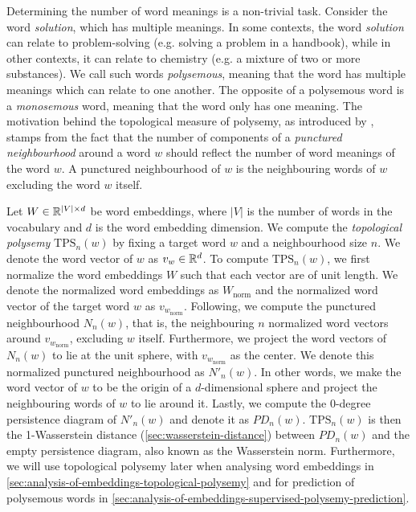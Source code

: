 Determining the number of word meanings is a non-trivial task. Consider the word \textit{solution}, which has multiple meanings. In some contexts, the word \textit{solution} can relate to problem-solving (e.g. solving a problem in a handbook), while in other contexts, it can relate to chemistry (e.g. a mixture of two or more substances). We call such words \textit{polysemous}, meaning that the word has multiple meanings which can relate to one another. The opposite of a polysemous word is a \textit{monosemous} word, meaning that the word only has one meaning. The motivation behind the topological measure of polysemy, as introduced by \cite{jakubowski2020topology}, stamps from the fact that the number of components of a \textit{punctured neighbourhood} around a word $w$ should reflect the number of word meanings of the word $w$. A punctured neighbourhood of $w$ is the neighbouring words of $w$ excluding the word $w$ itself.

Let $W \in \mathbb{R}^{|V| \times d}$ be word embeddings, where $|V|$ is the number of words in the vocabulary and $d$ is the word embedding dimension. We compute the \textit{topological polysemy} $\text{TPS}_n(w)$ by fixing a target word $w$ and a neighbourhood size $n$. We denote the word vector of $w$ as $v_w \in \mathbb{R}^{d}$. To compute $\text{TPS}_n(w)$, we first normalize the word embeddings $W$ such that each vector are of unit length. We denote the normalized word embeddings as $W_\text{norm}$ and the normalized word vector of the target word $w$ as $v_{w_{\text{norm}}}$. Following, we compute the punctured neighbourhood $N_n(w)$, that is, the neighbouring $n$ normalized word vectors around $v_{w_{\text{norm}}}$, excluding $w$ itself. Furthermore, we project the word vectors of $N_n(w)$ to lie at the unit sphere, with $v_{w_{\text{norm}}}$ as the center. We denote this normalized punctured neighbourhood as $N'_n(w)$. In other words, we make the word vector of $w$ to be the origin of a $d$-dimensional sphere and project the neighbouring words of $w$ to lie around it. Lastly, we compute the 0-degree persistence diagram of $N'_n(w)$ and denote it as $PD_n(w)$. $\text{TPS}_n(w)$ is then the 1-Wasserstein distance (\cref{sec:wasserstein-distance}) between $PD_n(w)$ and the empty persistence diagram, also known as the Wasserstein norm. Furthermore, we will use topological polysemy later when analysing word embeddings in \cref{sec:analysis-of-embeddings-topological-polysemy} and for prediction of polysemous words in \cref{sec:analysis-of-embeddings-supervised-polysemy-prediction}.


